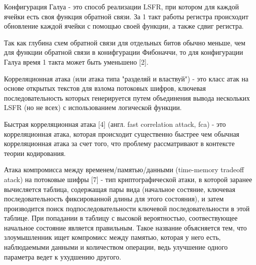 \documentclass[colorthm]{./civarticle}
\begin{document}
\begin{definition}
  Конфигурация Галуа - это способ реализации LSFR, при котором для каждой ячейки есть своя функция обратной связи. За 1 такт работы регистра происходит обновление каждой ячейки с помощью своей функции, а также сдвиг регистра.
\end{definition}

\begin{remark}
    Так как глубина схем обратной связи для отдельных битов обычно меньше, чем для функции обратной связи 
    в конифгурации Фибоначчи, то для конфигурации Галуа время 1 такта может быть уменьшено [2].
\end{remark}

\begin{definition}
  Корреляционная атака (или атака типа "разделяй и властвуй") - это класс атак на основе открытых текстов для взлома потоковых шифров, ключевая последовательность которых генерируется путем объединения вывода нескольких LSFR (но не всех) с использованием логической функции.
\end{definition}

\begin{definition}
  Быстрая корреляционная атака [4] (англ. fast correlation attack, fca) - это корреляционная атака, которая происходит существенно быстрее чем обычная корреляционная атака за счет того, что проблему рассматривают в контексте теории кодирования.
\end{definition}

\begin{definition}
  Атака компромисса между временем/памятью/данными (time-memory tradeoff atack) на потоковые шифры [7] - тип криптографической атаки, в которой заранее вычисляется таблица, содержащая пары вида (начальное состяние, ключевая последовательность фиксированной длины для этого состояния), и затем производится поиск подпоследовательности ключевой последовательности в этой таблице. При попадании в таблицу с высокой вероятностью, соотвествующее начальное состояние является правильным. Такое название объясняется тем, что злоумышленник ищет компромисс между памятью, которая у него есть, наблюдаемыми данными и количеством операции, ведь улучшение одного параметра ведет к ухудшению другого.
\end{definition}
\end{document}

